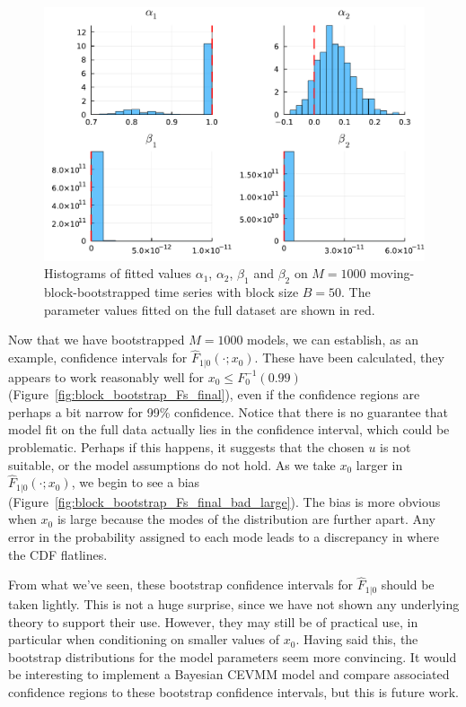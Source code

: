 \documentclass[11pt,twoside,openany]{book}
\numberwithin{Theorem}{chapter}
\numberwithin{Definition}{chapter}
\numberwithin{Lemma}{chapter}
\numberwithin{Algorithm}{chapter}
\numberwithin{equation}{chapter}
\begin{document}
\begin{figure}[htp]
  \centering
  \includegraphics[scale=0.75]{../ht-em/figures/block_bootstrap_params_final.pdf}
  \caption{Histograms of fitted values $\alpha_1$, $\alpha_2$, $\beta_1$ and $\beta_2$ on $M=1000$ moving-block-bootstrapped time series with block size $B=50$. The parameter values fitted
on the full dataset are shown in red.}\label{fig:block_bootstrap_params}
\end{figure}

\FloatBarrier
Now that we have bootstrapped $M=1000$ models, we
can establish, as an example,
confidence intervals for $\hat F_{1|0}(\cdot;x_0)$. These have been calculated,
they appears to work reasonably well for $x_0\leq F_0^{-1}(0.99)$
(Figure~\ref{fig:block_bootstrap_Fs_final}), even if
the confidence regions are perhaps a bit narrow for 99\% confidence.
Notice that there is no guarantee that model fit on the full data actually lies
in the confidence interval, which could be problematic. Perhaps if this happens,
it suggests that the chosen $u$ is not suitable, or the model assumptions do not hold.
As we take $x_0$ larger in $\hat F_{1|0}(\cdot;x_0)$, we begin to
see a bias (Figure~\ref{fig:block_bootstrap_Fs_final_bad_large}).
The bias is more obvious when $x_0$ is large because the modes of the
distribution are further apart. Any error in the probability
assigned to each mode leads to a discrepancy in where the CDF flatlines.

From what we've seen, these bootstrap confidence intervals for $\hat F_{1|0}$
should be taken lightly. This is not a huge surprise, since we have not shown
any underlying theory to support their use. However, they may still be of
practical use, in particular when conditioning on smaller values of $x_0$.
Having said this, the bootstrap distributions for the model parameters seem
more convincing. It would be interesting to implement a Bayesian CEVMM model
and compare associated confidence regions to these bootstrap confidence intervals,
but this is future work.
\end{document}
